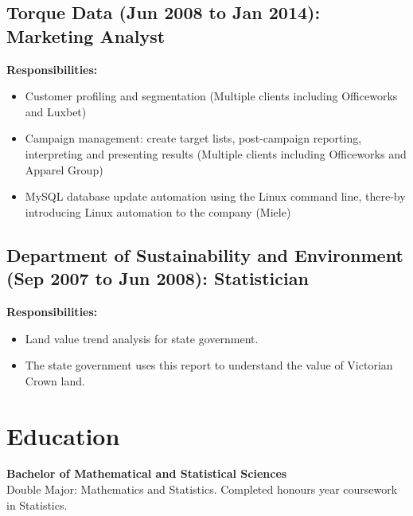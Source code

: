 \documentclass{article}
\begin{document}
\subsection{Torque Data (Jun 2008 to Jan 2014): Marketing Analyst}

\textbf{Responsibilities:}
\begin{itemize}
    \item Customer profiling and segmentation (Multiple clients including Officeworks and Luxbet) 
    \item Campaign management: create target lists, post-campaign reporting, interpreting and presenting results (Multiple clients including Officeworks and Apparel Group)
    \item MySQL database update automation using the Linux command line, there\hyp{}by introducing Linux automation to the company (Miele)
\end{itemize}

\subsection{Department of Sustainability and Environment (Sep 2007 to Jun 2008): Statistician}

\textbf{Responsibilities:}
\begin{itemize}
    \item Land value trend analysis for state government.
    \item The state government uses this report to understand the value of Victorian Crown land.
\end{itemize}

\section{Education}
\textbf{Bachelor of Mathematical and Statistical Sciences}
\\
Double Major: Mathematics and Statistics. Completed honours year coursework in Statistics.
\end{document}
